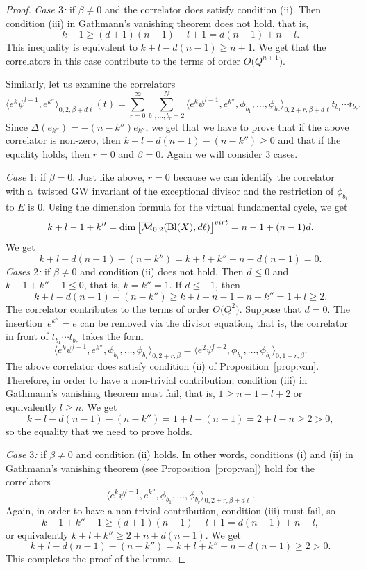 \documentclass[10pt,a4paper]{article}
\numberwithin{equation}{section}
\begin{document}
\begin{proof}
{\em Case $3$:} if $\beta\neq 0$ and the correlator does satisfy
condition (ii). Then condition (iii) in Gathmann's
vanishing theorem does not hold, that is,
\[
k-1 \geq (d+1)(n-1) - l+1 = d(n-1) + n-l.
\]
This inequality is equivalent to $k+l-d(n-1)\geq n+1$. We get that the
correlators in this case contribute to the terms of order
$O\big(Q^{n+1}\big)$.

Similarly, let us examine the correlators
\[
\big\langle e^k \psi^{l-1}, e^{k''}\big\rangle_{0,2,\beta+d\ell}(t) =
\sum_{r=0}^\infty
\sum_{b_1,\dots,b_r=2}^N
\big\langle e^k \psi^{l-1}, e^{k''},\phi_{b_1},\dots,\phi_{b_r}
\big\rangle_{0,2+r,\beta+d\ell}
t_{b_1}\cdots t_{b_r}.
\]
Since $\Delta(e_{k''}) = -(n-k'') e_{k''}$, we get that we have to
prove that if the above correlator is non-zero, then
$k+l-d(n-1) -(n-k'')\geq 0$ and that if the equality holds, then $r=0$
and $\beta=0$. Again we will consider 3 cases.

{\em Case $1$}: if $\beta=0$. Just like above,
$r=0$ because we can identify the correlator with a~twisted GW
invariant of the exceptional divisor and the restriction of
$\phi_{b_i}$ to $E$ is 0. Using the dimension formula for the virtual
fundamental cycle, we get
\[
k+l-1+k'' = \operatorname{dim}\big[
\overline{\mathcal{M}}_{0,2}(\operatorname{Bl}(X),d\ell)\big]^{\textnormal{virt}}
=
n-1+(n-1) d.
\]
We get
\[
k+l-d(n-1) -(n-k'') = k+l+k''-n-d(n-1) = 0.
\]
{\em Cases $2$:} if $\beta\neq 0$ and condition (ii) does not hold. Then
$d\leq 0$ and $k-1+k''-1\leq 0$, that is, $k=k''=1$. If
$d\leq -1$, then
\[
k+l-d(n-1)-(n-k'')\geq k+l +n-1-n+k'' = 1+l\geq 2.
\]
The correlator contributes to the terms of order $O\big(Q^2\big)$. Suppose
that $d=0$. The insertion~${e^{k''}=e}$ can be removed via the divisor
equation, that is, the correlator in front of $t_{b_1}\cdots t_{b_r}$
takes the form
\[
\big\langle e^k \psi^{l-1}, e^{k''},\phi_{b_1},\dots,\phi_{b_r}
\big\rangle_{0,2+r,\beta} =
\big\langle e^2 \psi^{l-2},\phi_{b_1},\dots,\phi_{b_r}
\big\rangle_{0,1+r,\beta}.
\]
The above correlator does satisfy condition (ii) of Proposition~\ref{prop:van}. Therefore, in order to have a non-trivial
contribution, condition (iii) in Gathmann's vanishing theorem must
fail, that is, $1\geq n-1 -l+2$ or equivalently $l\geq n$. We get
\[
k+l-d(n-1) -(n-k'') = 1+l-(n-1) = 2+l-n\geq 2 >0,
\]
so the equality that we need to prove holds.

{\em Case $3$:} if $\beta\neq 0$ and condition (ii) holds. In other words,
conditions (i) and (ii) in Gathmann's vanishing theorem (see
Proposition~\ref{prop:van}) hold for the correlators
\[
\big\langle e^k \psi^{l-1}, e^{k''},\phi_{b_1},\dots,\phi_{b_r}
\big\rangle_{0,2+r,\beta+d\ell}.
\]
Again, in order to have a non-trivial contribution, condition (iii) must fail, so
\[
k-1 + k''-1 \geq (d+1)(n-1)-l+1=d(n-1) +n -l,
\]
or equivalently $k+l+k'' \geq 2+ n + d(n-1)$. We get
\[
k+l-d(n-1) -(n-k'') = k+l+k''-n -d (n-1)\geq 2 >0.
\]
This completes the proof of the lemma.
\end{proof}
\end{document}
